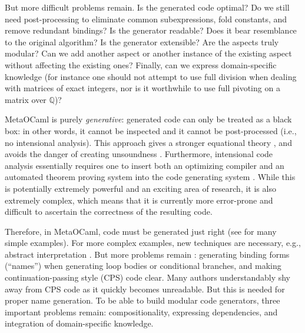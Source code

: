\documentclass{elsart}
\begin{document}
But more difficult problems remain. Is the generated code optimal? Do
we still need post-processing to eliminate common subexpressions,
fold constants, and remove redundant bindings? Is the generator readable?
Does it bear resemblance to the original algorithm? Is the generator
extensible? Are the aspects truly modular? Can we add another aspect or
another instance of the existing aspect without affecting the existing ones?
Finally, can we express domain-specific knowledge (for instance one should not
attempt to use full division when dealing with matrices of exact integers, nor
is it worthwhile to use full pivoting on a matrix over $\mathbb Q$)?

MetaOCaml is purely \emph{generative}: generated code can only be treated as
a black box: in other words, it cannot be inspected and it cannot be
post-processed (i.e., no intensional analysis). This approach gives a stronger
equational theory \cite{Taha2000}, and avoids the danger of creating
unsoundness \cite{TahaThesis}. Furthermore, intensional code analysis
essentially requires one to insert both an optimizing compiler and an
automated theorem proving system into the code generating system
\cite{Pueschel:05,Kennedy01Telescoping,dongarra7,Veldhuizen:2004}.
While this is potentially extremely powerful and an exciting area of
research, it is also extremely complex, which means that it is
currently more error-prone and difficult to ascertain the correctness
of the resulting code.

Therefore, in MetaOCaml, code must be generated just right (see
\cite{TahaThesis} for many simple examples).  For more complex
examples, new techniques are necessary, e.g., abstract interpretation
\cite{KiselyovTaha}.  But more problems remain
\cite{scp-CohenDGHKP06}: generating binding forms (``names'')
when generating loop bodies or conditional branches, and making
continuation-passing style (CPS) code clear.  Many authors
understandably shy away from CPS code as it quickly becomes
unreadable.  But this is needed for proper name generation.
To be able to build modular code generators, three important problems
remain: compositionality, expressing dependencies, and integration of
domain-specific knowledge.
\end{document}

